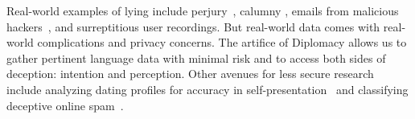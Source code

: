 Real-world examples of lying include perjury~\citep{louwerse2010linguistic},
calumny \citep{fornaciari2013automatic}, emails from malicious
hackers~\citep{Dhamija2006WhyPW}, and surreptitious user recordings.
%
But real-world data comes with real-world complications and privacy
concerns.
%
The artifice of Diplomacy allows us to gather pertinent language data
with minimal risk and to access both sides of deception: intention and
perception.
%
Other avenues for less secure research include analyzing dating
profiles for accuracy in self-presentation~\citep{toma2012lies} and classifying deceptive online spam~\citep{ott2011finding}.




